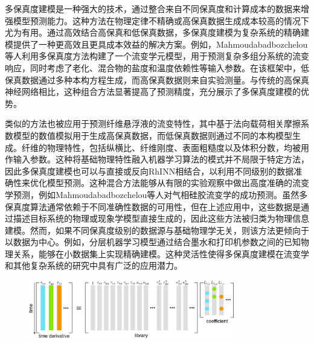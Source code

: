 多保真度建模是一种强大的技术，通过整合来自不同保真度和计算成本的数据来增强模型预测能力。这种方法在物理定律不精确或高保真数据生成成本较高的情况下尤为有用。通过高效结合高保真和低保真数据，多保真度建模为复杂系统的精确建模提供了一种更高效且更具成本效益的解决方案。例如，Mahmoudabadbozchelou等人利用多保真度方法构建了一个流变学元模型，用于预测复杂多组分系统的流变响应，同时考虑了老化、混合物的盐度和温度依赖性等输入参数\cite{mahmoudabadbozchelouDatadrivenPhysicsinformedConstitutive2021}。在该框架中，低保真数据通过多种本构方程生成，而高保真数据则来自实验测量。与传统的高保真神经网络相比，这种组合方法显著提高了预测精度，充分展示了多保真度建模的优势。

类似的方法也被应用于预测纤维悬浮液的流变特性，其中基于法向载荷相关摩擦系数模型的数值模拟用于生成高保真数据，而低保真数据则通过不同的本构模型生成。纤维的物理特性，包括纵横比、纤维刚度、表面粗糙度以及体积分数，均被用作输入参数。这种将基础物理特性融入机器学习算法的模式并不局限于特定方法，因此多保真度建模也可以与直接或反向RhINN相结合，以利用不同级别的数据准确性来优化模型预测。这种混合方法能够从有限的实验观察中做出高度准确的流变学预测，例如Mahmoudabadbozchelou等人对气相硅胶流变学的成功预测\cite{mahmoudabadbozchelouDigitalRheometerTwins2022}。虽然多保真度算法通常依赖于不同准确性数据的可用性，但在上述应用中，这些数据是通过描述目标系统的物理或现象学模型直接生成的，因此这些方法被归类为物理信息建模。然而，如果不同保真度级别的数据源与基础物理学无关，则该方法更倾向于以数据为中心。例如，分层机器学习模型通过结合墨水和打印机参数之间的已知物理关系，能够在小数据集上实现精确建模。这种灵活性使得多保真度建模在流变学和其他复杂系统的研究中具有广泛的应用潜力。
\begin{figure}[htbp]
  \centering
  \includegraphics[width=0.8\textwidth]{Fig/xianxingxishu.png}
\end{figure}
